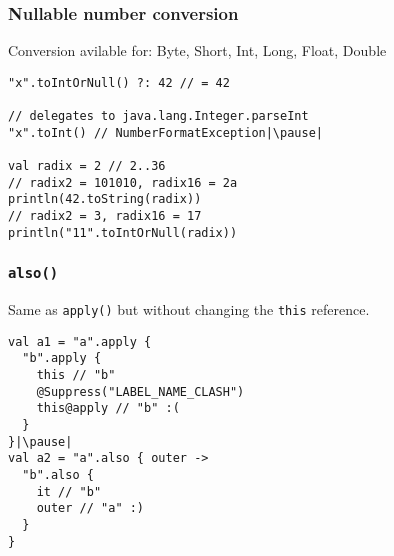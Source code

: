 
	

\begin{frame}[fragile] \frametitle{Nullable number conversion}
Conversion avilable for: Byte, Short, Int, Long, Float, Double
\begin{lstlisting}
"x".toIntOrNull() ?: 42 // = 42

// delegates to java.lang.Integer.parseInt
"x".toInt() // NumberFormatException|\pause|

val radix = 2 // 2..36
// radix2 = 101010, radix16 = 2a
println(42.toString(radix))
// radix2 = 3, radix16 = 17
println("11".toIntOrNull(radix))
\end{lstlisting}
\end{frame}


\begin{frame}[fragile] \frametitle{\texttt{also()}}
Same as \texttt{apply()} but without changing the \texttt{this} reference.
\begin{lstlisting}
val a1 = "a".apply {
  "b".apply {
    this // "b"
    @Suppress("LABEL_NAME_CLASH")
    this@apply // "b" :(
  }
}|\pause|
val a2 = "a".also { outer ->
  "b".also {
    it // "b"
    outer // "a" :)
  }
}
\end{lstlisting}
\end{frame}

